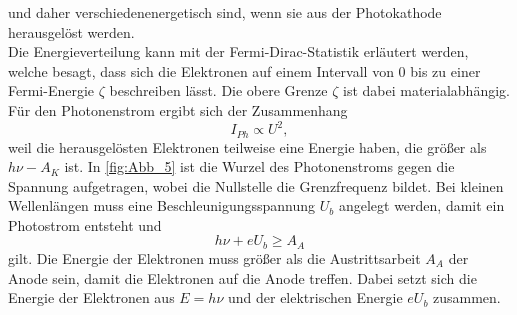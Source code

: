 und daher verschiedenenergetisch sind, wenn sie aus der Photokathode herausgelöst werden.\\
Die Energieverteilung kann mit der Fermi-Dirac-Statistik erläutert werden, welche besagt, dass sich die Elektronen auf einem Intervall
von 0 bis zu einer Fermi-Energie $\zeta$ beschreiben lässt. Die obere Grenze $\zeta$ ist dabei materialabhängig.
Für den Photonenstrom ergibt sich der Zusammenhang
\begin{equation*}
    I_{Ph} \propto U^2,
\end{equation*}
weil die herausgelösten Elektronen teilweise eine Energie haben, die größer als $h\nu -A_K$ ist.
In \autoref{fig:Abb_5} ist die Wurzel des Photonenstroms gegen die Spannung aufgetragen, wobei die Nullstelle  die 
Grenzfrequenz bildet.
Bei kleinen Wellenlängen muss eine Beschleunigungsspannung $U_b$ angelegt werden, damit ein Photostrom entsteht und
\begin{equation*}
    h\nu + e U_b \geq A_A
\end{equation*}
gilt. Die Energie der Elektronen muss größer als die Austrittsarbeit $A_A$ der Anode sein, damit die Elektronen auf die Anode treffen.
Dabei setzt sich die Energie der Elektronen aus $E = h \nu $ und der elektrischen Energie $e U_b$ zusammen.

